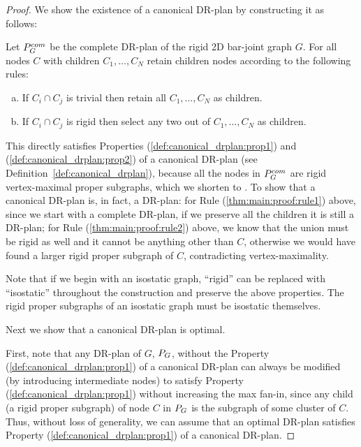\begin{proof}
    We show the existence of a canonical DR-plan by constructing it as follows:

    Let $P_{G}^{com}$ be the complete DR-plan of the rigid 2D bar-joint graph $G$.
    For all nodes $C$ with children $C_1,\ldots,C_N$ retain children nodes according to the following rules:
    \begin{enumerate}[(a)]
       \item \label{thm:main:proof:rule1} If $C_i \cap C_j$ is trivial then retain all $C_1,\ldots,C_N$ as children.
       \item \label{thm:main:proof:rule2} If $C_i \cap C_j$ is rigid then select any two out of $C_1,\ldots,C_N$ as children.
    \end{enumerate}

    This directly satisfies Properties (\ref{def:canonical_drplan:prop1}) and (\ref{def:canonical_drplan:prop2}) of a canonical DR-plan (see Definition~\ref{def:canonical_drplan}), because all the nodes in $P_{G}^{com}$ are rigid vertex-maximal proper subgraphs, which we shorten to . To show that a canonical DR-plan is, in fact, a DR-plan:
    for Rule (\ref{thm:main:proof:rule1}) above, since we start with a complete DR-plan, if we preserve all the children it is still a DR-plan; for Rule (\ref{thm:main:proof:rule2}) above, we know that the union must be rigid as well and it cannot be anything other than $C$, otherwise we would have found a larger rigid proper subgraph of $C$, contradicting vertex-maximality.

    Note that if we begin with an isostatic graph, ``rigid'' can be replaced with ``isostatic'' throughout the construction and preserve the above properties. The rigid proper subgraphs of an isostatic graph must be isostatic themselves.

    Next we show that a canonical DR-plan is optimal.

    First, note that any DR-plan of $G$, $P_{G}$, without the Property (\ref{def:canonical_drplan:prop1}) of a canonical DR-plan can always be modified (by introducing intermediate nodes) to satisfy Property (\ref{def:canonical_drplan:prop1}) without increasing the max fan-in, since any child (a rigid proper subgraph) of node $C$ in $P_{G}$  is the subgraph of some cluster of $C$.
    Thus, without loss of generality, we can assume that an optimal DR-plan satisfies Property (\ref{def:canonical_drplan:prop1}) of a canonical DR-plan.


\end{proof}
